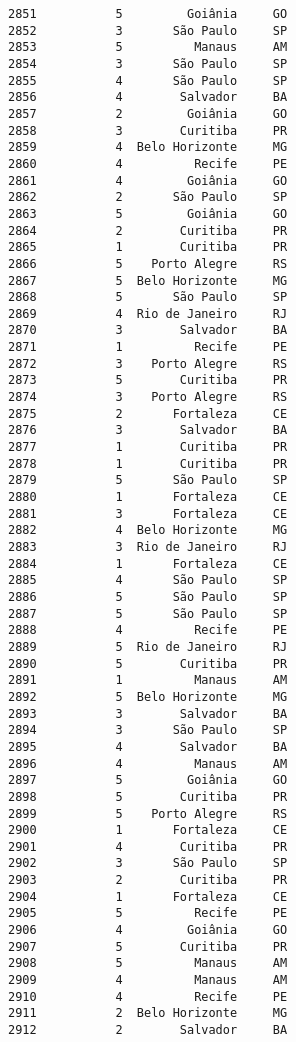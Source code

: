 \documentclass[11pt]{article}
\begin{document}
\begin{Verbatim}[commandchars=\\\{\}]
2851           5         Goiânia     GO  
2852           3       São Paulo     SP  
2853           5          Manaus     AM  
2854           3       São Paulo     SP  
2855           4       São Paulo     SP  
2856           4        Salvador     BA  
2857           2         Goiânia     GO  
2858           3        Curitiba     PR  
2859           4  Belo Horizonte     MG  
2860           4          Recife     PE  
2861           4         Goiânia     GO  
2862           2       São Paulo     SP  
2863           5         Goiânia     GO  
2864           2        Curitiba     PR  
2865           1        Curitiba     PR  
2866           5    Porto Alegre     RS  
2867           5  Belo Horizonte     MG  
2868           5       São Paulo     SP  
2869           4  Rio de Janeiro     RJ  
2870           3        Salvador     BA  
2871           1          Recife     PE  
2872           3    Porto Alegre     RS  
2873           5        Curitiba     PR  
2874           3    Porto Alegre     RS  
2875           2       Fortaleza     CE  
2876           3        Salvador     BA  
2877           1        Curitiba     PR  
2878           1        Curitiba     PR  
2879           5       São Paulo     SP  
2880           1       Fortaleza     CE  
2881           3       Fortaleza     CE  
2882           4  Belo Horizonte     MG  
2883           3  Rio de Janeiro     RJ  
2884           1       Fortaleza     CE  
2885           4       São Paulo     SP  
2886           5       São Paulo     SP  
2887           5       São Paulo     SP  
2888           4          Recife     PE  
2889           5  Rio de Janeiro     RJ  
2890           5        Curitiba     PR  
2891           1          Manaus     AM  
2892           5  Belo Horizonte     MG  
2893           3        Salvador     BA  
2894           3       São Paulo     SP  
2895           4        Salvador     BA  
2896           4          Manaus     AM  
2897           5         Goiânia     GO  
2898           5        Curitiba     PR  
2899           5    Porto Alegre     RS  
2900           1       Fortaleza     CE  
2901           4        Curitiba     PR  
2902           3       São Paulo     SP  
2903           2        Curitiba     PR  
2904           1       Fortaleza     CE  
2905           5          Recife     PE  
2906           4         Goiânia     GO  
2907           5        Curitiba     PR  
2908           5          Manaus     AM  
2909           4          Manaus     AM  
2910           4          Recife     PE  
2911           2  Belo Horizonte     MG  
2912           2        Salvador     BA  

\end{Verbatim}
\end{document}
